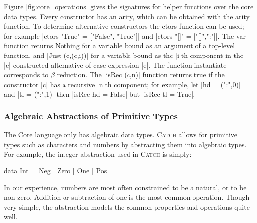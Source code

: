 \documentclass[preprint]{sigplanconf}
\newcommand{\C}[1]{\textsf{#1}}
\newcommand{\catch}{\textsc{Catch}}
\begin{document}
Figure \ref{fig:core_operations} gives the signatures for helper functions over the core data types. Every constructor has an arity, which can be obtained with the \C{arity} function. To determine alternative constructors the \C{ctors} function can be used; for example |ctors "True" = ["False", "True"]| and |ctors "[]" = ["[]",":"]|. The \C{var} function returns \C{Nothing} for a variable bound as an argument of a top-level function, and |Just (e,(c,i))| for a variable bound as the |i|th component in the |c|-constructed alternative of case-expression |e|. The function \C{instantiate} corresponds to $\beta$ reduction. The |isRec (c,n)| function returns true if the constructor |c| has a recursive |n|th component; for example, let |hd = (":",0)| and |tl = (":",1)| then |isRec hd = False| but |isRec tl = True|.

\subsubsection{Algebraic Abstractions of Primitive Types}
\label{sec:abstraction}

\begin{comment}
Natural numbers are often encoded by Peano numerals, and this idea can easily be extended to integers:

\begin{code}
data Pos  = One | Succ Pos
data Int  = Minus Pos | Zero | Plus Pos
\end{code}

Although this abstraction of \C{Int} captures all the underlying detail of the number system, the underlying constraint systems discussed in \S\ref{sec:constraint} would be unable to distinguishing between any pair of numbers both greater than 2, or both less than -2.
\end{comment}

The Core language only has algebraic data types. \catch{} allows for primitive types such as characters and numbers by abstracting them into algebraic types. For example, the integer abstraction used in \catch{} is simply:

\begin{code}
data Int = Neg | Zero | One | Pos
\end{code}

In our experience, numbers are most often constrained to be a natural, or to be non-zero. Addition or subtraction of one is the most common operation. Though very simple, the abstraction models the common properties and operations quite well.
\end{document}
